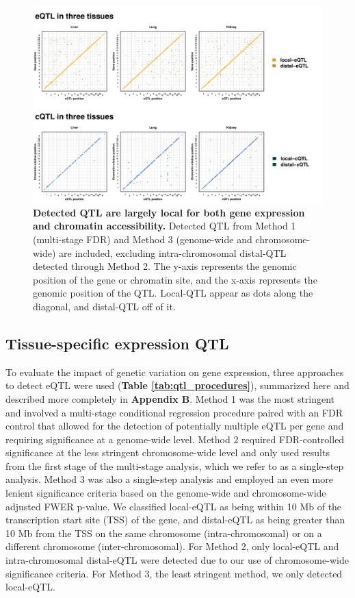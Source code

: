 \documentclass[9pt,twocolumn,twoside]{gsajnl}
\begin{document}
\begin{figure}[h]
\renewcommand{\familydefault}{\sfdefault}\normalfont
\centering
\includegraphics[width=\textwidth, trim={0in 0in 0in 0in}, clip]{figs/qtl_map_main.pdf}
\caption{\textbf{Detected QTL are largely local for both gene expression and chromatin accessibility.} Detected QTL from Method 1 (multi-stage FDR) and Method 3 (genome-wide and chromosome-wide) are included, excluding intra-chromosomal distal-QTL detected through Method 2. The y-axis represents the genomic position of the gene or chromatin site, and the x-axis represents the genomic position of the QTL. Local-QTL appear as dots along the diagonal, and distal-QTL off of it.
\label{fig:grid_plot}}
\end{figure}

\subsection{Tissue-specific expression QTL}

To evaluate the impact of genetic variation on gene expression, three approaches to detect eQTL were used (\textbf{Table \ref{tab:qtl_procedures}}), summarized here and described more completely in \textbf{Appendix B}. Method 1 was the most stringent and involved a multi-stage conditional regression procedure paired with an FDR control that allowed for the detection of potentially multiple eQTL per gene and requiring significance at a genome-wide level. Method 2 required FDR-controlled significance at the less stringent chromosome-wide level and only used results from the first stage of the multi-stage analysis, which we refer to as a single-step analysis. Method 3 was also a single-step analysis and employed an even more lenient significance criteria based on the genome-wide and chromosome-wide adjusted FWER p-value. We classified local-eQTL as being within 10 Mb of the transcription start site (TSS) of the gene, and distal-eQTL as being greater than 10 Mb from the TSS on the same chromosome (intra-chromosomal) or on a different chromosome (inter-chromosomal). For Method 2, only local-eQTL and intra-chromosomal distal-eQTL were detected due to our use of chromosome-wide significance criteria. For Method 3, the least stringent method, we only detected local-eQTL.
\end{document}
